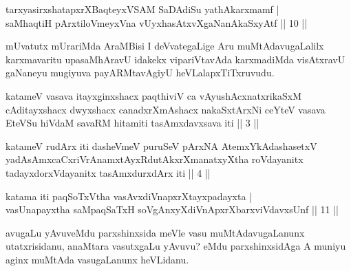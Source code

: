 
\begin{shl}
tarxyasirxshatapxrXBaqteyxVSAM SaDAdiSu yathAkarxmamf |\\
saMhaqtiH pArxtiloVmeyxVna \footnotemark[1]{}vUyxhasAtxvXgaNanAkaSxyAtf \hfill || 10 ||
\end{shl}

\begin{artha}
mUvatutx mUrariMda AraMBisi I deVvategaLige Aru muMtAdavugaLalilx karxmavaritu upasaMhAravU idakekx vipariVtavAda karxmadiMda  visAtxravU gaNaneyu mugiyuva payARMtavAgiyU heVLalapxTiTxruvudu.
\end{artha}


\begin{kandikeshl}
katameV vasava itayxginxshacx paqthiviV ca vAyushAcxnatxrikaSxM cAditayxshacx dwyxshacx canadxrXmAshacx nakaSxtArxNi ceYteV vasava EteVSu hiVdaM savaRM hitamiti tasAmxdavxsava iti || 3 ||
\end{kandikeshl}

\begin{kandikeshl}
katameV rudArx iti dasheVmeV puruSeV pArxNA AtemxYkAdashasetxV yadAsAmxcaCxriVrAnamxtAyxRdutAkxrXmanatxyXtha roVdayanitx tadayxdorxVdayanitx tasAmxdurxdArx iti || 4 ||
\end{kandikeshl}

\begin{shl}
katama iti paqSoTxV\s tha vasAvxdiVnapxrXtayxpadayxta |\\
vasUnapayxtha saMpaqSaTxH soV\s gAnxyXdiVnApxrXbarxviVdavxsUnf \hfill || 11 ||
\end{shl}

\begin{artha}
avugaLu yAvuveMdu parxshinxsida meVle vasu muMtAdavugaLanunx utatxrisidanu, anaMtara vasutxgaLu yAvuvu? eMdu parxshinxsidAga A muniyu aginx muMtAda vasugaLanunx heVLidanu.
\end{artha}

